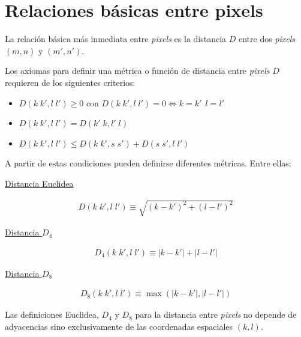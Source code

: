 \section{Relaciones b\'asicas entre pixels}

La relaci\'on b\'asica m\'as inmediata entre \textit{pixels} es la distancia $D$ entre dos \textit{pixels} $(m, n)$ y $(m', n')$.
%

Los axiomas para definir una m\'etrica o funci\'on de distancia entre \textit{pixels} $D$ requieren de los siguientes criterios:

\begin{itemize}
 \item $D(k \; k', l \; l') \geq 0$ con $D(k \; k', l \; l') = 0 \Leftrightarrow k=k' \, \; l=l'$
 \item $D(k \; k', l \; l') = D(k' \; k, l' \; l)$
 \item $D(k \; k', l \; l') \leq D(k \; k', s \; s') + D(s \; s', l \; l')$
\end{itemize}

A partir de estas condiciones pueden definirse diferentes m\'etricas. Entre ellas:

\begin{center}
 \underline{Distancia Euclidea}


\begin{eqnarray}
	D(k \; k', l \; l') \equiv \sqrt{\left( k - k' \right)^2 + \left( l - l' \right)^2}
\label{EqXXXIII}
\end{eqnarray}

 \underline{Distancia $D_{4}$}


\begin{eqnarray}
	D_{4}(k \; k', l \; l') \equiv \lvert k - k' \rvert + \lvert l - l' \rvert
\label{EqXXXIV}
\end{eqnarray}

 \underline{Distancia $D_{8}$}


\begin{eqnarray}
	D_{8}(k \; k', l \; l') \equiv \max \left( \lvert k - k' \rvert , \lvert l - l' \rvert \right)
\label{EqXXXIV}
\end{eqnarray}

\end{center}

Las definiciones Euclidea, $D_{4}$ y $D_{8}$ para la distancia entre \textit{pixels} no depende de adyacencias sino exclusivamente de las coordenadas
espaciales $(k, l)$.
%

